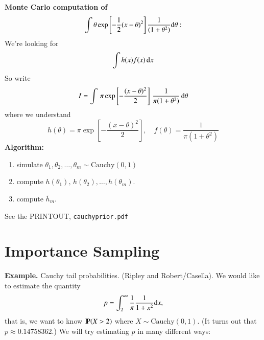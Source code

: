 \documentclass[11pt,english]{scrbook}
\begin{document}
\bigskip \noindent

\textbf{Monte Carlo computation of}
\[
\int \theta \exp \left[-\frac{1}{2}(x - \theta)^2  \right] \frac{1}{(1 + \theta^{2})} \diff \theta :
\]
We're looking for
\[
\int h(x)f(x)\,\diff x
\]
So write
\[
I = \int \,\pi \exp\left[-\frac{(x - \theta)^{2}}{2} \right]\,\frac{1}{\pi(1 + \theta^{2})}\, \diff \theta
\]
where we understand
\[
h(\theta) = \pi \exp\left[-\frac{(x - \theta)^{2}}{2} \right],\quad f(\theta) = \frac{1}{\pi(1 + \theta^{2})}
\]
\textbf{Algorithm:}
\begin{enumerate}
\item simulate \(\theta_{1},\theta_{2},\ldots,\theta_{m}\sim \mathrm{Cauchy}(0,1)\)
\item compute \(h(\theta_{1}),\,h(\theta_{2}),\ldots,h(\theta_{m})\).
\item compute \(\overline{h}_{m}\).
\end{enumerate}

See the PRINTOUT, \texttt{cauchyprior.pdf}


\section{Importance Sampling}
\label{sec:org9d91dd2}

\textbf{Example.} Cauchy tail probabilities. (Ripley and Robert/Casella). 
We would like to estimate the quantity 
\[
p=\int_{2}^{\infty}\frac{1}{\pi}\frac{1}{1+x^{2}}\diff x,
\]
that is, we want to know \(\P(X > 2)\) where \(X \sim \mathrm{Cauchy}(0,1)\). (It turns out that \(p\approx 0.14758362\).) We will try estimating \(p\) in many different ways:
\end{document}
